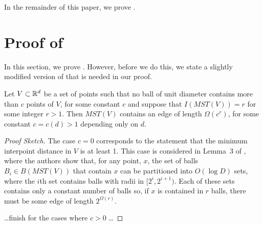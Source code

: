\documentclass{patmorin}
\newcommand{\mst}{\mathit{MST}}
\begin{document}
In the remainder of this paper, we prove .

\section{Proof of }

In this section, we prove .  However, before we do this,
we state a slightly modified version of  that is needed in
our proof.

\begin{lem}
  Let $V\subset\mathbb{R}^d$ be a set of points such that no ball of unit
  diameter contains more than $c$ points of $V$, for some constant $c$
  and suppose that $I(MST(V))=r$ for some integer $r>1$.  Then $MST(V)$
  contains an edge of length $\Omega(c^r)$, for some constant $c=c(d)>1$
  depending only on $d$.
\end{lem}

\begin{proof}[Proof Sketch]
The case $c=0$ corresponds to the statement that the minimum interpoint
distance in $V$ is at least 1.  This case is considered in Lemma~3 of
\cite{msz11}, where the authors show that, for any point, $x$, the set
of balls $B_i\in B(\mst(V))$ that contain $x$ can be partitioned into
$O(\log D)$ sets, where the $i$th set contains balls with radii in
$[2^i,2^{i+1})$.  Each of these sets contains only a constant number of
balls so, if $x$ is contained in $r$ balls, there must be some edge of
length $2^{\Omega(r)}$.

\noindent\ldots finish for the cases where $c>0$ \ldots
\end{proof}
\end{document}
